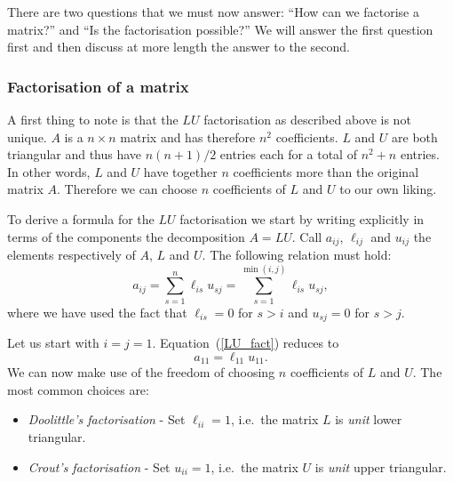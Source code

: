 There are two questions that we must now answer: ``How can we
factorise a matrix?'' and ``Is the factorisation possible?''  We will
answer the first question first and then discuss at more length the
answer to the second.

\subsubsection{Factorisation of a matrix}

A first thing to note is that the $L U$ factorisation as described
above is not unique.   $A$ is a $n \times n$ matrix and has therefore
$n^2$ coefficients.   $L$ and $U$ are both triangular and thus have
$n(n+1)/2$ entries each for a total of $n^2 + n$ entries.
In other words, $L$ and $U$ have together $n$ coefficients more than the
original matrix $A$.  Therefore we can choose $n$ coefficients of $L$
and $U$ to our own liking.

To derive a formula for the $LU$ factorisation we start by writing
explicitly in terms of the components the decomposition $A = L U$.
Call $a_{i j}$, $\ell_{i j}$ and $u_{i j}$ the elements respectively
of $A$, $L$ and $U$.    The following relation must hold:
%
\begin{equation}
  a_{i j} = \sum_{s=1}^n \ell_{i s} u_{s j} =
  \sum_{s=1}^{\min(i,j)} \ell_{i s} u_{s j} ,
  \label{LU_fact}
\end{equation}
%
where we have used the fact that $\ell_{i s} = 0$ for $s>i$ and $u_{s
j}=0$ for $s > j$.

Let us start with $i=j=1$.   Equation~(\ref{LU_fact}) reduces to
%
\begin{equation*}
 a_{1 1} = \ell_{1 1} u_{1 1} .
\end{equation*}
%
We can now make use of the freedom of choosing $n$ coefficients of $L$
and $U$.     The most common choices are:
%
\begin{itemize}
%
\item \textit{Doolittle's factorisation} - Set $\ell_{i i} = 1$,
i.e.\ the matrix $L$ is \textit{unit} lower triangular.
%
\item \textit{Crout's factorisation} - Set $u_{i i} = 1$, i.e.\ the
matrix $U$ is \textit{unit} upper triangular.
%
\end{itemize}

